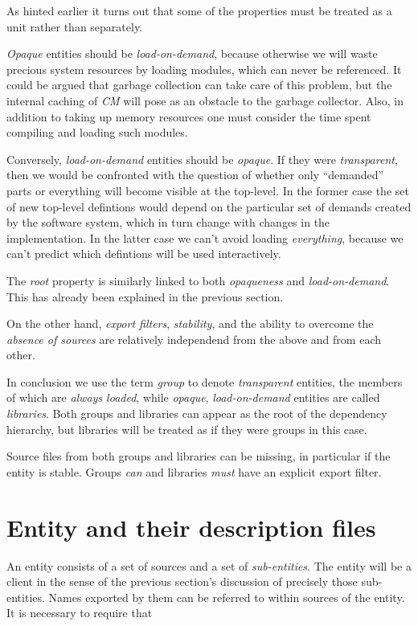 As hinted earlier it turns out that some of the properties must be treated
as a unit rather than separately.

{\em Opaque} entities should be {\em load-on-demand}, because otherwise we
will waste precious system resources by loading modules, which can never be
referenced.  It could be argued that garbage collection can take care of
this problem, but the internal caching of {\em CM} will pose as an obstacle
to the garbage collector.  Also, in addition to taking up memory resources
one must consider the time spent compiling and loading such modules.

Conversely, {\em load-on-demand} entities should be {\em opaque}.  If they
were {\em transparent}, then we would be confronted with the question of
whether only ``demanded'' parts or everything will become visible at the
top-level.  In the former case the set of new top-level defintions would
depend on the particular set of demands created by the software system,
which in turn change with changes in the implementation.  In the latter
case we can't avoid loading {\em everything}, because we can't predict
which defintions will be used interactively.

The {\em root} property is similarly linked to both {\em opaqueness} and
{\em load-on-demand}.  This has already been explained in the previous
section.

On the other hand, {\em export filters}, {\em stability}, and the ability
to overcome the {\em absence of sources} are relatively independend from
the above and from each other.

In conclusion we use the term {\em group} to denote {\em
transparent} entities, the members of which are {\em always
loaded}, while {\em opaque}, {\em load-on-demand} entities
are called {\em libraries}.  Both groups and libraries can
appear as the root of the dependency hierarchy, but
libraries will be treated as if they were groups in this case.

Source files from both groups and libraries can be missing,
in particular if the entity is stable.  Groups {\em can} and
libraries {\em must} have an explicit export filter.

\section{Entity and their description files}

An entity consists of a set of sources and a set of {\em
sub-entities}.  The entity will be a client in the sense of
the previous section's discussion of precisely those
sub-entities.  Names exported by them can be referred to within
sources of the entity.  It is necessary to require that

